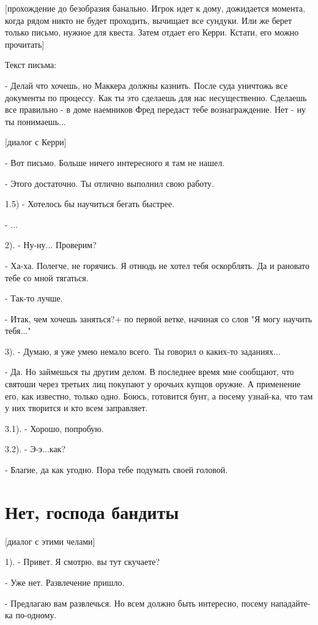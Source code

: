 \documentclass[12pt,a4paper]{book}
\begin{document}
[прохождение до безобразия банально. Игрок идет к дому, дожидается момента, когда рядом никто не будет проходить, вычищает все сундуки. Или же берет только письмо, нужное для квеста. Затем отдает его Керри. Кстати, его можно прочитать]

Текст письма:

- Делай что хочешь, но Маккера должны казнить. После суда уничтожь все документы по процессу. Как ты это сделаешь для нас несущественно. Сделаешь все правильно - в доме наемников Фред передаст тебе вознаграждение. Нет - ну ты понимаешь...

[диалог с Керри]

- Вот письмо. Больше ничего интересного я там не нашел.

- Этого достаточно. Ты отлично выполнил свою работу.

1.5) - Хотелось бы научиться бегать быстрее.

- ...

2). - Ну-ну... Проверим?

- Ха-ха. Полегче, не горячись. Я отнюдь не хотел тебя оскорблять. Да и рановато тебе со мной тягаться.

- Так-то лучше.

- Итак, чем хочешь заняться?+ по первой ветке, начиная со слов "Я могу научить тебя..."

3). - Думаю, я уже умею немало всего. Ты говорил о каких-то заданиях...

- Да. Но займешься ты другим делом. В последнее время мне сообщают, что святоши через третьих лиц покупают у орочьих купцов оружие. А применение его, как известно, только одно. Боюсь, готовится бунт, а посему узнай-ка, что там у них творится и кто всем заправляет.

3.1). - Хорошо, попробую.

3.2). - Э-э...как?

- Благие, да как угодно. Пора тебе подумать своей головой.

\section{Нет, господа бандиты}

[диалог с этими челами]

1). - Привет. Я смотрю, вы тут скучаете?

- Уже нет. Развлечение пришло.

- Предлагаю вам развлечься. Но всем должно быть интересно, посему нападайте-ка по-одному.
\end{document}
